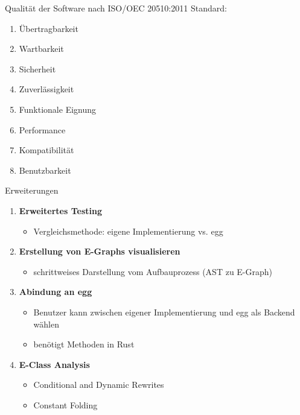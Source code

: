 \begin{frame}{Qualität der Software}
    nach ISO/OEC 20510:2011 Standard:\vspace{4mm}

    \begin{enumerate}
        \bf
        \item Übertragbarkeit
        \item Wartbarkeit
        \item Sicherheit
        \item Zuverlässigkeit
        \item Funktionale Eignung
        \item Performance
        \item Kompatibilität
        \item Benutzbarkeit
    \end{enumerate}
\end{frame}

\begin{frame}{Erweiterungen}
    \begin{enumerate}
        \item \textbf{Erweitertes Testing}
        \begin{itemize}
            \item Vergleichsmethode: eigene Implementierung vs. egg 
        \end{itemize}
        \item \textbf{Erstellung von E-Graphs visualisieren}
        \begin{itemize}
            \item schrittweises Darstellung vom Aufbauprozess (AST zu E-Graph) 
        \end{itemize}
        \item \textbf{Abindung an egg}
        \begin{itemize}
            \item Benutzer kann zwischen eigener Implementierung und egg als Backend wählen
            \item benötigt Methoden in Rust
        \end{itemize}
        \item \textbf{E-Class Analysis}
        \begin{itemize}
            \item Conditional and Dynamic Rewrites
            \item Constant Folding
        \end{itemize}
    \end{enumerate}
\end{frame}